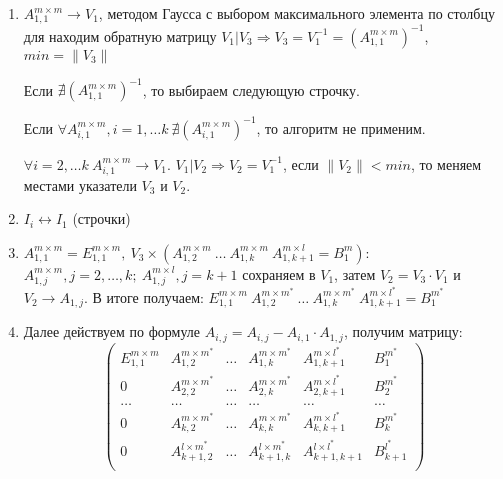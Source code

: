 \documentclass[12pt]{report}
\begin{document}
        \begin{enumerate}
            
            \item \label{alg:reverse} $ A^{m \times m}_{1,1} \rightarrow V_{1} $, методом Гаусса с выбором
            максимального элемента по столбцу для находим обратную матрицу $V_{1} | V_{3} \Rightarrow V_{3} = V_{1}^{-1}
            =  (A^{m \times m}_{1,1})^{-1}$, $min = \| V_{3} \|  $ 
            
            Если $ \nexists (A^{m \times m}_{1,1})^{-1}$, то выбираем следующую строчку.
            
            Если $\forall A^{m \times m}_{i,1}, i = 1, \ldots k \ \nexists (A^{m \times m}_{i,1})^{-1}$,
            то алгоритм не применим.
            
            $\forall i = 2, \ldots k \ A^{m \times m}_{i,1} \rightarrow V_{1}$.
            $V_{1} | V_{2} \Rightarrow V_{2} = V_{1}^{-1}$, если $\| V_{2} \| < min$, 
            то меняем местами указатели $V_{3}$ и $V_{2}$.   
            
            \item \label{alg:swap} $I_{i} \leftrightarrow I_{1}$ (строчки)
            
            \item \label{alg:mult} 
            $A_{1,1}^{m \times m} = E_{1,1}^{m \times m}, \ V_{3} \times (A_{1,2}^{m \times m} \ \ldots \ A_{1,k}^{m \times m} \ A_{1,k+1}^{m \times l}
             = B^{m}_{1})$: \\
            $A_{1,j}^{m \times m}, j = 2, \ldots, k; \ A_{1,j}^{m \times l}, j = k + 1$ сохраняем в $V_{1}$,
            затем $V_{2} = V_{3} \cdot V_{1}$ и $V_{2} \rightarrow A_{1,j}$.
            В итоге получаем: $ E_{1,1}^{m \times m} \ A_{1,2}^{m \times m^*}    \ \ldots \ A_{1,k}^{m \times m^*} \ A_{1,k+1}^{m \times l^*} = B^{m^*}_{1}$
            
            \item  \label{alg:form} Далее действуем по формуле $A_{i, j} = A_{i, j} - A_{i,1} \cdot A_{1,j}$, получим матрицу:
            \[
            \left(
            \begin{array}{ccccc|c}
                E_{1,1}^{m \times m} & A_{1,2}^{m \times m^*}   & \ldots & A_{1,k}^{m \times m^*}   & A_{1,k+1}^{m \times l^*}    & B^{m^*}_{1}   \\  
                0                    & A_{2,2}^{m \times m^*}   & \ldots & A_{2,k}^{m \times m^*}   & A_{2,k+1}^{m \times l^*}    & B^{m^*}_{2}   \\  
                \ldots               & \ldots                   & \ldots & \ldots                   & \ldots                      & \ldots        \\  
                0                    & A_{k,2}^{m \times m^*}   & \ldots & A_{k,k}^{m \times m^*}   & A_{k,k+1}^{m \times l^*}    & B^{m^*}_{k}   \\  
                0                    & A_{k+1,2}^{l \times m^*} & \ldots & A_{k+1,k}^{l \times m^*} & A_{k+1, k+1}^{l \times l^*} & B^{l^*}_{k+1} \\  
            \end{array}
            \right)
            \]


\end{enumerate}
\end{document}
